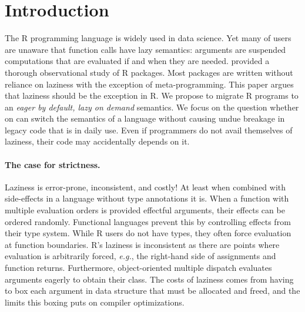 \documentclass[review,creen,acmsmall]{acmart}
\newcommand{\eg}{\emph{e.g.},\xspace}
\begin{document}


\maketitle
\section{Introduction}

The R programming language is widely used in data science. Yet many of users are
unaware that function calls have lazy semantics: arguments are suspended
computations that are evaluated if and when they are needed. \citet{oopsla19b}
provided a thorough observational study of R packages. Most packages are written
without reliance on laziness with the exception of meta-programming. This paper
argues that laziness should be the exception in R. We propose to migrate R
programs to an \emph{eager by default, lazy on demand} semantics. We focus on
the question whether on can switch the semantics of a language without causing
undue breakage in legacy code that is in daily use. Even if programmers do not
avail themselves of laziness, their code may accidentally depends on it.

\paragraph{The case for strictness.} Laziness is error-prone, inconsistent,
and costly! At least when combined with side-effects in a language without type
annotations it is. When a function with multiple evaluation orders is provided
effectful arguments, their effects can be ordered randomly. Functional languages
prevent this by controlling effects from their type system. While R users do not
have types, they often force evaluation at function boundaries. R's laziness is
inconsistent as there are points where evaluation is arbitrarily forced, \eg the
right-hand side of assignments and function returns. Furthermore,
object-oriented multiple dispatch evaluates arguments eagerly to obtain their
class. The costs of laziness comes from having to box each argument in data
structure that must be allocated and freed, and the limits this boxing puts on
compiler optimizations.
\end{document}
